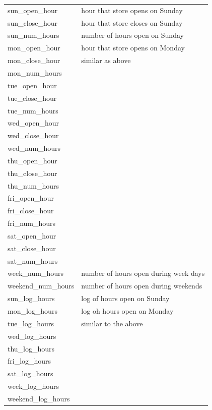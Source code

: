 \documentclass[
]{article}
\begin{document}
\begin{longtable}{ll}
sun\_open\_hour & hour that store opens on Sunday  \\
sun\_close\_hour & hour that store closes on Sunday  \\
sun\_num\_hours & number of hours open on Sunday  \\
mon\_open\_hour & hour that store opens on Monday  \\
mon\_close\_hour & similar as above  \\
mon\_num\_hours &   \\
tue\_open\_hour &   \\
tue\_close\_hour &   \\
tue\_num\_hours &   \\
wed\_open\_hour &   \\
wed\_close\_hour &   \\
wed\_num\_hours &   \\
thu\_open\_hour &   \\
thu\_close\_hour &   \\
thu\_num\_hours &   \\
fri\_open\_hour &   \\
fri\_close\_hour &   \\
fri\_num\_hours &   \\
sat\_open\_hour &   \\
sat\_close\_hour &   \\
sat\_num\_hours &   \\
week\_num\_hours & number of hours open during week days  \\
weekend\_num\_hours & number of hours open during weekends  \\
sun\_log\_hours & log of hours open on Sunday  \\
mon\_log\_hours & log oh hours open on Monday  \\
tue\_log\_hours & similar to the above  \\
wed\_log\_hours &   \\
thu\_log\_hours &   \\
fri\_log\_hours &   \\
sat\_log\_hours &   \\
week\_log\_hours &   \\
weekend\_log\_hours &   \\ \bottomrule
\end{longtable}

\clearpage
\end{document}
